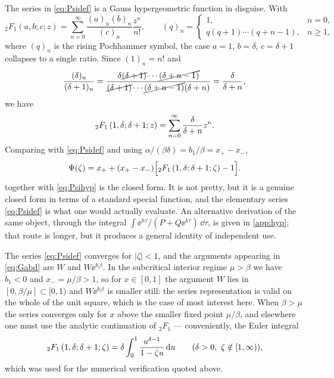 The series in \cref{eq:Psidef} is a Gauss hypergeometric function in disguise. With
\begin{equation}
\label{eq:2F1def}
{}_2F_1(a,b;c;z) = \sum^\infty_{n=0}\frac{(a)_n(b)_n}{(c)_n}\frac{z^n}{n!},
\qquad
(q)_n = \begin{cases} 1, & n=0,\\ q(q+1)\cdots(q+n-1), & n\ge1,\end{cases}
\end{equation}
where $(q)_n$ is the rising Pochhammer symbol, the case $a=1$, $b=\delta$, $c=\delta+1$
collapses to a single ratio. Since $(1)_n = n!$ and
\begin{equation}
\label{eq:pochcancel}
\frac{(\delta)_n}{(\delta+1)_n}
= \frac{\delta\cancel{(\delta+1)}\cdots\cancel{(\delta+n-1)}}
       {\cancel{(\delta+1)}\cdots\cancel{(\delta+n-1)}(\delta+n)}
= \frac{\delta}{\delta+n},
\end{equation}
we have
\begin{equation}
\label{eq:2F1simple}
{}_2F_1\left(1,\delta;\delta+1;z\right) = \sum_{n=0}^{\infty}\frac{\delta}{\delta+n}z^n .
\end{equation}
Comparing with \cref{eq:Psidef} and using
$\alpha/(\beta\delta) = b_1/\beta = x_+-x_-$,
\begin{equation}
\label{eq:Psihyp}
\Psi(\zeta) = x_+ + (x_+-x_-)\Bigl[{}_2F_1\left(1,\delta;\delta+1;\zeta\right) - 1\Bigr].
\end{equation}
 together with \cref{eq:Psihyp} is the closed form. It is not pretty, but it
is a genuine closed form in terms of a standard special function, and the elementary series
\cref{eq:Psidef} is what one would actually evaluate. An alternative derivation of the same
object, through the integral $\int\ee^{h\tau}/(P+Q\ee^{k\tau})\,\dd\tau$, is given in
\cref{app:hyp}; that route is longer, but it produces a general identity of independent
use.

\begin{remark}
\label{rem:domain}
The series \cref{eq:Psidef} converges for $|\zeta|<1$, and the arguments appearing in
\cref{eq:Gabd} are $W$ and $W\ee^{b_1t}$. In the subcritical interior regime $\mu>\beta$ we
have $b_1<0$ and $x_-=\mu/\beta>1$, so for $x\in[0,1]$ the argument $W$ lies in
$[0,\beta/\mu]\subset[0,1)$ and $W\ee^{b_1t}$ is smaller still: the series representation
is valid on the whole of the unit square, which is the case of most interest here. When
$\beta>\mu$ the series converges only for $x$ above the smaller fixed point $\mu/\beta$,
and elsewhere one must use the analytic continuation of ${}_2F_1$ --- conveniently, the
Euler integral
\begin{equation*}
{}_2F_1\left(1,\delta;\delta+1;\zeta\right) = \delta\int_0^1\frac{u^{\delta-1}}{1-\zeta u}\,{\rm d} u
\qquad (\delta>0,\ \zeta\notin[1,\infty)),
\end{equation*}
which was used for the numerical verification quoted above.
\end{remark}

